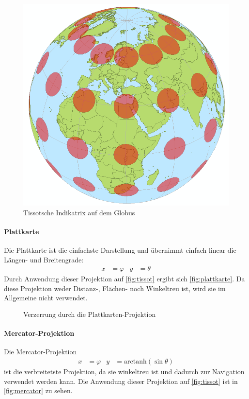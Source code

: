 				\begin{figure}
					\centering
					\includegraphics[width=0.3\linewidth]{tissotworld}
					\caption{Tissotsche Indikatrix auf dem Globus}
					\label{fig:tissot}
				\end{figure}

				\paragraph{Plattkarte}
					Die Plattkarte ist die einfachste Darstellung und übernimmt einfach linear die Längen- und Breitengrade:
					\begin{align}
						x &= \varphi &
						y &= \theta
					\end{align}
					Durch Anwendung dieser Projektion auf \autoref{fig:tissot} ergibt sich \autoref{fig:plattkarte}. Da diese Projektion weder Distanz-, Flächen- noch Winkeltreu ist, wird sie im Allgemeine nicht verwendet.

					\begin{figure}
						\centering
						\def\svgwidth{\linewidth}
						
						\caption{Verzerrung durch die Plattkarten-Projektion}
						\label{fig:plattkarte}
					\end{figure}

				\paragraph{Mercator-Projektion}
					Die Mercator-Projektion
					\begin{align}
						x &= \varphi &
						y &= \mathrm{arctanh}(\sin\theta)
					\end{align}
					ist die verbreitetste Projektion, da sie winkeltreu ist und dadurch zur Navigation verwendet werden kann. Die Anwendung dieser Projektion auf \autoref{fig:tissot} ist in \autoref{fig:mercator} zu sehen.

